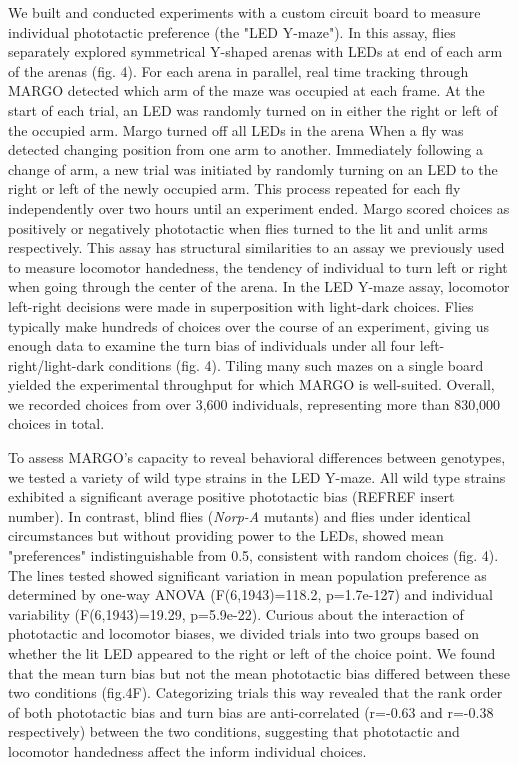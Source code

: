 \documentclass[10pt]{article}
\begin{document}
\begin{multicols}{2}
We built and conducted experiments with a custom circuit board to measure individual phototactic preference (the "LED Y-maze"). In this assay, flies separately explored symmetrical Y-shaped arenas with LEDs at end of each arm of the arenas (fig. 4). For each arena in parallel, real time tracking through MARGO detected which arm of the maze was occupied at each frame. At the start of each trial, an LED was randomly turned on in either the right or left  of the occupied arm. Margo turned off all LEDs in the arena When a fly was detected changing position from one arm to another. Immediately following a change of arm, a new trial was initiated by randomly turning on an LED to the right or left of the newly occupied arm. This process repeated for each fly independently over two hours until an experiment ended. Margo scored choices as positively or negatively phototactic when flies turned to the lit and unlit arms respectively. This assay has structural similarities to an assay we previously used to measure locomotor handedness, the tendency of individual to turn left or right when going through the center of the arena. In the LED Y-maze assay, locomotor left-right decisions were made in superposition with light-dark choices. Flies typically make hundreds of choices over the course of an experiment, giving us enough data to examine the turn bias of individuals under all four left-right/light-dark conditions (fig. 4). Tiling many such mazes on a single board yielded the experimental throughput for which MARGO is well-suited. Overall, we recorded choices from over 3,600 individuals, representing more than 830,000 choices in total.

To assess MARGO's capacity to reveal behavioral differences between genotypes, we tested a variety of wild type strains in the LED Y-maze. All wild type strains exhibited a significant average positive phototactic bias (REFREF insert number). In contrast, blind flies (\emph{Norp-A} mutants) and flies under identical circumstances but without providing power to the LEDs, showed mean "preferences" indistinguishable from 0.5, consistent with random choices (fig. 4). The lines tested showed significant variation in mean population preference as determined by one-way ANOVA (F(6,1943)=118.2, p=1.7e-127) and individual variability (F(6,1943)=19.29, p=5.9e-22). Curious about the interaction of phototactic and locomotor biases, we divided trials into two groups based on whether the lit LED appeared to the right or left of the choice point. We found that the mean turn bias but not the mean phototactic bias differed between these two conditions (fig.4F). Categorizing trials this way revealed that the rank order of both phototactic bias and turn bias are anti-correlated (r=-0.63 and r=-0.38 respectively) between the two conditions, suggesting that phototactic and locomotor handedness affect the inform individual choices. 


\end{multicols}
\end{document}
